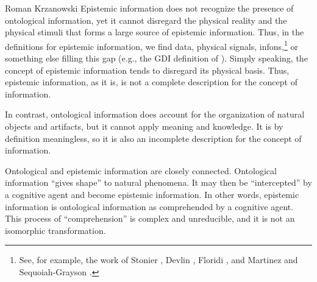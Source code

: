 \begin{artengenv}{Roman Krzanowski}
Epistemic information does not recognize the presence of ontological information, yet it cannot disregard the physical reality and the physical stimuli that forms a large source of epistemic information. Thus, in the definitions for epistemic information, we find data, physical signals, infons,\footnote{See, for example, the work of Stonier
\parencite*[][]{stonier_information_1990}, %
 Devlin 
\parencite*[][]{devlin_logic_1991}, %
 Floridi 
\parencite*[][]{floridi_philosophy_2010}, %
 and Martinez and Sequoiah-Grayson 
\parencite*[][]{martinez_logic_2016}. %
} or something else filling this gap (e.g., the GDI definition of 
\parencite[][]{floridi_philosophy_2010}%
). Simply speaking, the concept of epistemic information tends to disregard its physical basis. Thus, epistemic information, as it is, is not a complete description for the concept of information.

In contrast, ontological information does account for the organization of natural objects and artifacts, but it cannot apply meaning and knowledge. It is by definition meaningless, so it is also an incomplete description for the concept of information.

Ontological and epistemic information are closely connected. Ontological information ``gives shape'' to natural phenomena. It may then be ``intercepted'' by a cognitive agent and become epistemic information. In other words, epistemic information is ontological information as comprehended by a cognitive agent. This process of ``comprehension'' is complex and unreducible, and it is not an isomorphic transformation.


\end{artengenv}
